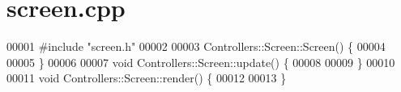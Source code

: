 \section{screen.\+cpp}
\label{screen_8cpp_source}

\begin{DoxyCode}
00001 \textcolor{preprocessor}{#include "screen.h"}
00002 
00003 Controllers::Screen::Screen() \{
00004 
00005 \}
00006 
00007 \textcolor{keywordtype}{void} Controllers::Screen::update() \{
00008 
00009 \}
00010 
00011 \textcolor{keywordtype}{void} Controllers::Screen::render() \{
00012     
00013 \}
\end{DoxyCode}
